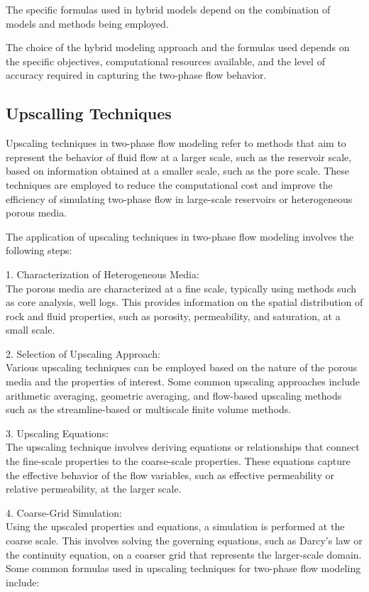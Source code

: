 \documentclass[letterpaper,12pt]{article}
\begin{document}
	The specific formulas used in hybrid models depend on the combination of models and methods being employed. 
	
	The choice of the hybrid modeling approach and the formulas used depends on the specific objectives, computational resources available, and the level of accuracy required in capturing the two-phase flow behavior.
	
	
	
	\subsection{Upscalling Techniques}
	Upscaling techniques in two-phase flow modeling refer to methods that aim to represent the behavior of fluid flow at a larger scale, such as the reservoir scale, based on information obtained at a smaller scale, such as the pore scale. These techniques are employed to reduce the computational cost and improve the efficiency of simulating two-phase flow in large-scale reservoirs or heterogeneous porous media.\smallskip
	
	The application of upscaling techniques in two-phase flow modeling involves the following steps:\smallskip
	
	1. Characterization of Heterogeneous Media:\\
		 The porous media are characterized at a fine scale, typically using methods such as core analysis, well logs. This provides information on the spatial distribution of rock and fluid properties, such as porosity, permeability, and saturation, at a small scale.
	
	2. Selection of Upscaling Approach:\\
		 Various upscaling techniques can be employed based on the nature of the porous media and the properties of interest. Some common upscaling approaches include arithmetic averaging, geometric averaging, and flow-based upscaling methods such as the streamline-based or multiscale finite volume methods.
	
	3. Upscaling Equations: \\
		The upscaling technique involves deriving equations or relationships that connect the fine-scale properties to the coarse-scale properties. These equations capture the effective behavior of the flow variables, such as effective permeability or relative permeability, at the larger scale.
	
	4. Coarse-Grid Simulation: \\
		 Using the upscaled properties and equations, a simulation is performed at the coarse scale. This involves solving the governing equations, such as Darcy's law or the continuity equation, on a coarser grid that represents the larger-scale domain.
	\smallskip
	Some common formulas used in upscaling techniques for two-phase flow modeling include:
	
\end{document}
